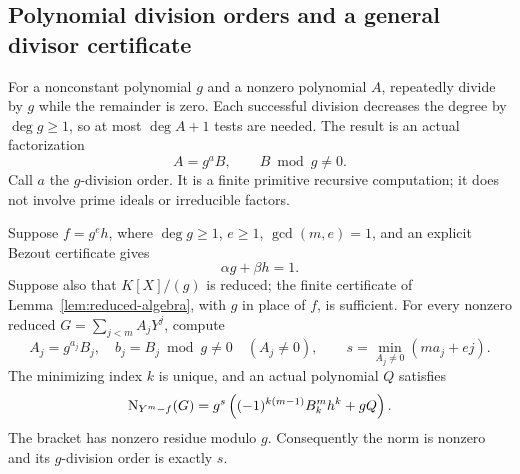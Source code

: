 \subsection{Polynomial division orders and a general divisor certificate}

For a nonconstant polynomial $g$ and a nonzero polynomial $A$, repeatedly divide by $g$ while the remainder is zero. Each successful division decreases the degree by $\deg g\ge1$, so at most $\deg A+1$ tests are needed. The result is an actual factorization
\[
 A=g^aB,\qquad B\bmod g\ne0.
\]
Call $a$ the $g$-division order. It is a finite primitive recursive computation; it does not involve prime ideals or irreducible factors.

\begin{theorem}\label{thm:divisor-norm}
Suppose $f=g^eh$, where $\deg g\ge1$, $e\ge1$, $\gcd(m,e)=1$, and an explicit Bezout certificate gives
\[
 \alpha g+\beta h=1.
\]
Suppose also that $K[X]/(g)$ is reduced; the finite certificate of Lemma~\ref{lem:reduced-algebra}, with $g$ in place of $f$, is sufficient. For every nonzero reduced $G=\sum_{j<m}A_jY^j$, compute
\[
 A_j=g^{a_j}B_j,\quad b_j=B_j\bmod g\ne0
 \quad(A_j\ne0),
 \qquad s=\min_{A_j\ne0}(ma_j+ej).
\]
The minimizing index $k$ is unique, and an actual polynomial $Q$ satisfies
\begin{equation}\label{eq:adic-norm}
 \operatorname{N}_{Y^m-f}(G)=g^s\left((-1)^{k(m-1)}B_k^mh^k+gQ\right).
\end{equation}
The bracket has nonzero residue modulo $g$. Consequently the norm is nonzero and its $g$-division order is exactly $s$.
\end{theorem}
